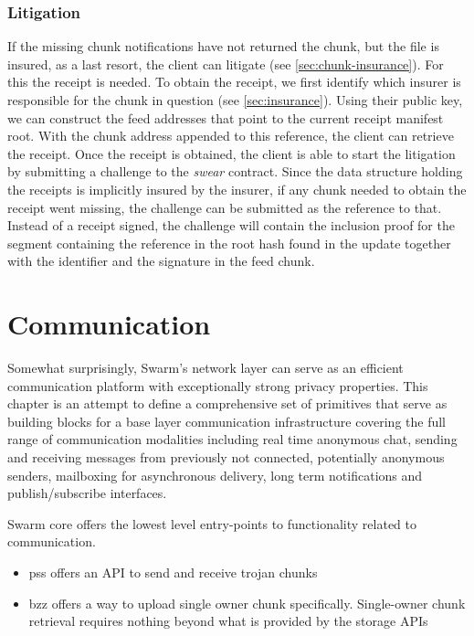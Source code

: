 \subsubsection{Litigation}

If the missing chunk notifications have not returned the chunk, but the file is insured, as a last resort, the client can litigate (see \ref{sec:chunk-insurance}). For this the receipt is needed. To obtain the receipt, we first identify which insurer is responsible for the chunk in question (see \ref{sec:insurance}). Using their public key, we can construct the feed addresses that point to the current receipt manifest root. With the chunk address appended to this reference, the client can retrieve the receipt. Once the receipt is obtained, the client is able to start the litigation by submitting a challenge to the \emph{swear} contract. Since the data structure holding the receipts is implicitly insured by the insurer, if any chunk needed to obtain the receipt went missing, the challenge can be submitted as the reference to that. Instead of a receipt signed, the challenge will contain the inclusion proof for the segment containing the reference in the root hash found  in the update together with the identifier and the signature in the feed chunk. 

\section{Communication \statusred}\label{sec:messaging}


Somewhat surprisingly, Swarm's network layer can serve as  an efficient  communication platform with exceptionally strong privacy properties. This chapter is an attempt to define a comprehensive set of primitives that serve as building blocks for a base layer communication infrastructure covering the full range of communication modalities including real time anonymous chat, sending and receiving messages from previously not connected, potentially anonymous senders, mailboxing for asynchronous delivery, long term notifications and  publish/subscribe interfaces. 

Swarm core offers the lowest level entry-points to functionality related to communication.

\begin{itemize}
    \item pss offers an API to send and receive trojan chunks
    \item bzz offers a way to upload single owner chunk specifically. Single-owner chunk retrieval requires nothing beyond what is provided by the storage APIs
\end{itemize}



